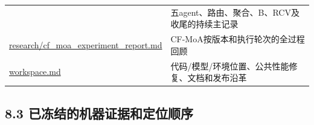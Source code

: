 \documentclass[
  11pt,
  a4paper,
]{article}
\begin{document}
{\begin{longtable}[]{@{}
  >{\raggedright\arraybackslash}p{}
  >{\raggedright\arraybackslash}p{}@{}}
& 五agent、路由、聚合、B、RCV及收尾的持续主记录 \\
\href{https://github.com/xiotakut/cf_mrg/blob/main/papers/2026-10-02_cf_moa/author_dossier/records/research/cf_moa_experiment_report.md}{research/\allowbreak{}cf\_\allowbreak{}moa\_\allowbreak{}experiment\_\allowbreak{}report.\allowbreak{}md}
& CF-MoA按版本和执行轮次的全过程回顾 \\
\href{https://github.com/xiotakut/cf_mrg/blob/main/papers/2026-10-02_cf_moa/author_dossier/records/workspace.md}{workspace.md}
& 代码/模型/环境位置、公共性能修复、文档和发布沿革 \\
\end{longtable}
}

\subsection{8.3
已冻结的机器证据和定位顺序}\label{ux5df2ux51bbux7ed3ux7684ux673aux5668ux8bc1ux636eux548cux5b9aux4f4dux987aux5e8f}
\end{document}
